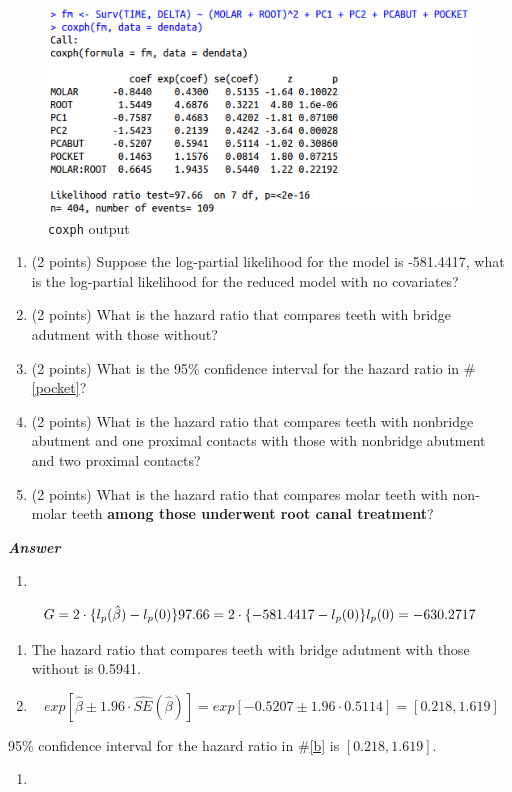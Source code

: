\documentclass[]{article}
\providecommand{\tightlist}{%
  \setlength{\itemsep}{0pt}\setlength{\parskip}{0pt}}
\begin{document}
\begin{figure}
\centering
\includegraphics[width=4.68750in]{dental.png}
\caption{\texttt{coxph} output}
\end{figure}

\begin{enumerate}
\def\labelenumi{\alph{enumi}.}
\tightlist
\item
  (2 points) Suppose the log-partial likelihood for the model is
  -581.4417, what is the log-partial likelihood for the reduced model
  with no covariates?
\item
  (2 points) What is the hazard ratio that compares teeth with bridge
  adutment with those without? \label{pocket}
\item
  (2 points) What is the 95\% confidence interval for the hazard ratio
  in \#\ref{pocket}?
\item
  (2 points) What is the hazard ratio that compares teeth with nonbridge
  abutment and one proximal contacts with those with nonbridge abutment
  and two proximal contacts?
\item
  (2 points) What is the hazard ratio that compares molar teeth with
  non-molar teeth \textbf{among those underwent root canal treatment}?
\end{enumerate}

\textbf{\emph{Answer}}

\begin{enumerate}
\def\labelenumi{\alph{enumi}.}
\item
\end{enumerate}

\[G = 2 \cdot \{ l_p(\hat{\beta}) -l_p(0) \} \\ 
97.66 = 2 \cdot \{ -581.4417 -l_p(0) \} \\
l_p(0) = -630.2717\]

\begin{enumerate}
\def\labelenumi{\alph{enumi}.}
\setcounter{enumi}{1}
\item
  The hazard ratio that compares teeth with bridge adutment with those
  without is 0.5941.
\item
  \[exp[\hat{\beta} \pm 1.96 \cdot \widehat{SE}(\hat{\beta}) ] =  exp[-0.5207 \pm 1.96 \cdot 0.5114] = [0.218, 1.619]\]
\end{enumerate}

95\% confidence interval for the hazard ratio in \#\ref{b} is
\([0.218, 1.619]\).

\begin{enumerate}
\def\labelenumi{\alph{enumi}.}
\setcounter{enumi}{3}
\item
\end{enumerate}
\end{document}
